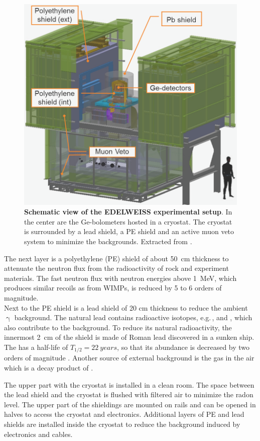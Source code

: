   \begin{figure}[ht]
    \centering
    \includegraphics[width=0.75\textwidth{}]{./fig/exp_setup.png}
    \caption{\textbf{Schematic view of the EDELWEISS experimental setup}.
    In the center are the Ge-bolometers hosted in a cryostat. The cryostat is surrounded by a lead shield, a PE shield and an active muon veto system to minimize the backgrounds. Extracted from \cite{Kef16}.}
    \label{fig:exp-setup}
  \end{figure}


  The next layer is a polyethylene (PE) shield of about \SI{50}{cm} thickness to attenuate the neutron flux from the radioactivity of rock and experiment materials. The fast neutron flux with neutron energies above \SI{1}{MeV}, which produces similar recoils as from WIMPs, is reduced by 5 to 6 orders of magnitude. \\%
  Next to the PE shield is a lead shield of 20 cm thickness to reduce the ambient $\upgamma$ background. The natural lead contains radioactive isotopes, e.g.\,,  and , which also contribute to the background. To reduce its natural radioactivity, the innermost \SI{2}{cm} of the shield is made of Roman lead discovered in a sunken ship. The  has a half-life of $T_{1/2}=\SI{22}{years}$, so that its abundance is decreased by two orders of magnitude \cite{Sch13a}.
  Another source of external background is the  gas in the air which is a decay product of .

  The upper part with the cryostat is installed in a clean room. The space between the lead shield and the cryostat is flushed with filtered air to minimize the radon level.
  The upper part of the shieldings are mounted on rails and can be opened in halves to access the cryostat and electronics. Additional layers of PE and lead shields are installed inside the cryostat to reduce the background induced by electronics and cables.

